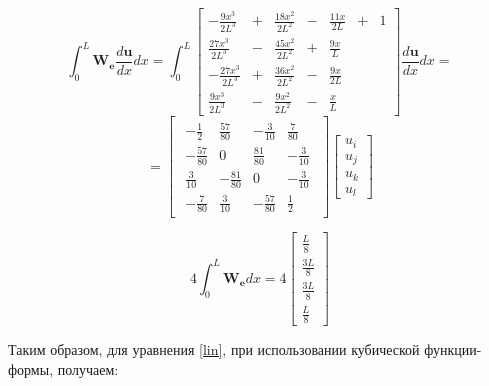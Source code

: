 $$
  \int_0^L \mathbf{W_e} \frac{d \mathbf{u}}{dx} dx
=
 \int_0^L
\begin{bmatrix}
  -\frac{9x^3}{2L^3}&+&\frac{18x^2}{2L^2}&-&\frac{11x}{2L} &+& 1\\
  \frac{27x^3}{2L^3}&-&\frac{45x^2}{2L^2}&+&\frac{9x}{L}&&\\
  -\frac{27x^3}{2L^3}&+&\frac{36x^2}{2L^2}&-&\frac{9x}{2L}&&\\
  \frac{9x^3}{2L^3}&-&\frac{9x^2}{2L^2}&-&\frac{x}{L}&&
\end{bmatrix}
\frac{d \mathbf{u}}{dx} dx
=
$$
$$
=
 
\begin{bmatrix}
\begin{array}{rrrr}
	-\frac{1}{2} & \frac{57}{80} & -\frac{3}{10} & \frac{7}{80}\\
	-\frac{57}{80} & 0 & \frac{81}{80} & -\frac{3}{10} \\
	\frac{3}{10} & -\frac{81}{80} & 0 & -\frac{3}{10}\\
	-\frac{7}{80} & \frac{3}{10} & -\frac{57}{80} & \frac{1}{2}
\end{array}
\end{bmatrix}
\begin{bmatrix}
	u_i \\
	u_j \\
	u_k\\
	u_l
\end{bmatrix}
$$

$$
4 \int_0^L \mathbf{W_e} d x
=
4
\begin{bmatrix}
	\frac{L}{8} \\
	\frac{3L}{8}\\
	\frac{3L}{8}\\
	\frac{L}{8}
\end{bmatrix}
$$

\newpage
Таким образом, для уравнения \ref{lin}, при использовании кубической функции-формы,  получаем:

